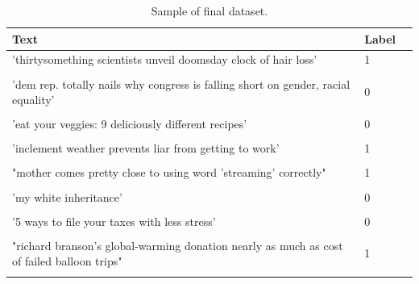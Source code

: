 \newpage
\begin{longtable}[]{p{12cm}lp{}}
	\toprule
	Text & Label \tabularnewline
	\midrule
	\endhead
	'thirtysomething scientists unveil doomsday clock of hair loss'  & 1 \\ \tabularnewline
	
	'dem rep. totally nails why congress is falling short on gender, racial equality' & 0 \\ \tabularnewline
	
	'eat your veggies: 9 deliciously different recipes' & 0  \\ \tabularnewline
	
	'inclement weather prevents liar from getting to work' & 1\\   \tabularnewline
	
	"mother comes pretty close to using word 'streaming' correctly" & 1 \\ \tabularnewline
	
	'my white inheritance' & 0\\ \tabularnewline
	
	'5 ways to file your taxes with less stress' & 0 \\ \tabularnewline
	
	"richard branson's global-warming donation nearly as much as cost of failed balloon trips" & 1 \tabularnewline

	\bottomrule
	\caption{Sample of final dataset.}
	\label{table:sample}
\end{longtable}





